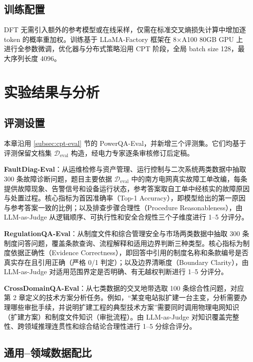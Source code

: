 \documentclass[fontset=fandol,type=master,campus=shenzhen,etitleauto=true]{hithesisbook}
\begin{document}
\subsection{训练配置}\label{subsec:sft-config}

DFT 无需引入额外的参考模型或在线采样，仅需在标准交叉熵损失计算中增加逐 token 的概率重加权。训练基于 LLaMA-Factory 框架在 8×A100 80GB GPU 上进行全参数微调，优化器与分布式策略沿用 CPT 阶段，全局 batch size 128，最大序列长度 4096。

\section{实验结果与分析}\label{sft-ux8badux7ec3ux4e0eux5b9eux9a8cux7ed3ux679c}

\subsection{评测设置}\label{subsec:sft-eval}

本章沿用 \ref{subsec:cpt-eval} 节的 PowerQA-Eval，并新增三个评测集。它们均基于评测保留文档集 $\mathcal{D}_{\text{eval}}$ 构造，经电力专家逐条审核修订后定稿。

\textbf{FaultDiag-Eval}：从运维检修与资产管理、运行控制与二次系统两类数据中抽取 300 条故障诊断问题，题目主要依据 $\mathcal{D}_{\text{eval}}$ 中的南方电网真实故障工单改编，每条提供故障现象、告警信号和设备运行状态，参考答案取自工单中经核实的故障原因与处置过程。核心指标为首因准确率（Top-1 Accuracy），即模型给出的第一原因与参考答案一致的比例；以及排查步骤合理性（Procedure Reasonableness），由 LLM-as-Judge 从逻辑顺序、可执行性和安全合规性三个子维度进行 1--5 分评分。

\textbf{RegulationQA-Eval}：从制度文件和综合管理安全与市场两类数据中抽取 300 条制度问答问题，覆盖条款查询、流程解释和适用边界判断三种类型。核心指标为制度依据正确性（Evidence Correctness），即回答中引用的制度名称和条款编号是否真实存在且引用正确（严格 0/1 判定）；以及边界清晰度（Boundary Clarity），由 LLM-as-Judge 对适用范围界定是否明确、有无越权判断进行 1--5 分评分。

\textbf{CrossDomainQA-Eval}：从七类数据的交叉地带选取 100 条综合性问题，对应第 2 章定义的技术方案分析任务。例如，“某变电站拟扩建一台主变，分析需要办理哪些审批手续，并说明扩建工程的典型技术方案”需要同时调用物理电网知识（扩建方案）和制度文件知识（审批流程）。由 LLM-as-Judge 对知识覆盖完整性、跨领域推理连贯性和综合结论合理性进行 1--5 分综合评分。
\subsection{通用--领域数据配比}\label{subsec:sft-ratio}
\end{document}
